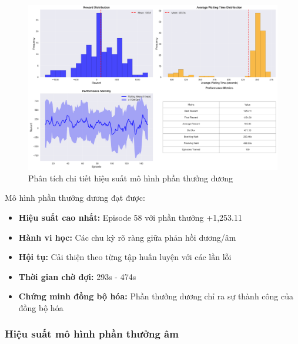 \begin{figure}[!htp]
    \centering
    \includegraphics[width=\textwidth]{figures/sync_positive_model_summary.png}
    \caption{Phân tích chi tiết hiệu suất mô hình phần thưởng dương}
    \label{fig:sync_positive_model_summary}
\end{figure}

Mô hình phần thưởng dương đạt được:
\begin{itemize}
    \item \textbf{Hiệu suất cao nhất:} Episode 58 với phần thưởng +1,253.11

    \item \textbf{Hành vi học:} Các chu kỳ rõ ràng giữa phản hồi dương/âm

    \item \textbf{Hội tụ:} Cải thiện theo từng tập huấn luyện với các lần lỗi

    \item \textbf{Thời gian chờ đợi:} 293s - 474s

    \item \textbf{Chứng minh đồng bộ hóa:} Phần thưởng dương chỉ ra sự thành công của đồng bộ hóa
\end{itemize}

\subsubsection{Hiệu suất mô hình phần thưởng âm}

